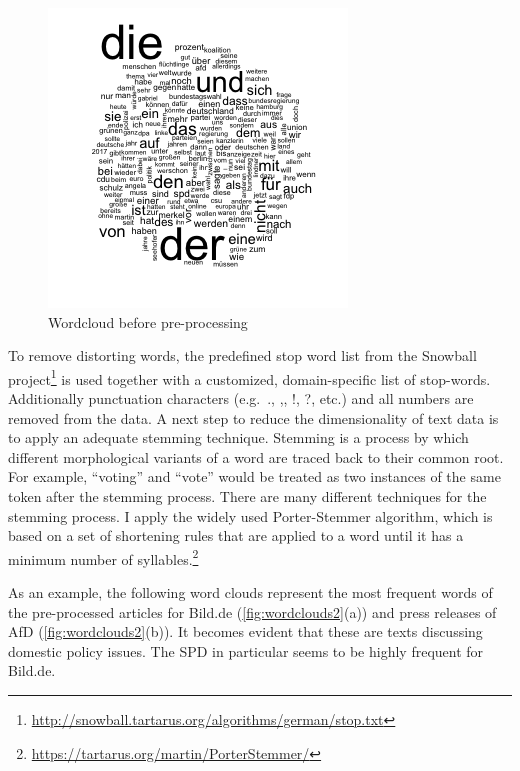 \documentclass[
]{article}
\begin{document}
\begin{figure}

{\centering \includegraphics[width=0.4\linewidth]{../figs/wordcloud} 

}

\caption{Wordcloud before pre-processing \label{fig:wordcloud1}}\label{fig:wordcloud pre-processing}
\end{figure}

To remove distorting words, the predefined stop word list from the
Snowball project\footnote{\url{http://snowball.tartarus.org/algorithms/german/stop.txt}}
is used together with a customized, domain-specific list of stop-words.
Additionally punctuation characters (e.g.~., ,, !, ?, etc.) and all
numbers are removed from the data. A next step to reduce the
dimensionality of text data is to apply an adequate stemming technique.
Stemming is a process by which different morphological variants of a
word are traced back to their common root. For example, ``voting'' and
``vote'' would be treated as two instances of the same token after the
stemming process. There are many different techniques for the stemming
process. I apply the widely used Porter-Stemmer algorithm, which is
based on a set of shortening rules that are applied to a word until it
has a minimum number of syllables.\footnote{\url{https://tartarus.org/martin/PorterStemmer/}}

As an example, the following word clouds represent the most frequent
words of the pre-processed articles for Bild.de
(\autoref{fig:wordclouds2}(a)) and press releases of AfD
(\autoref{fig:wordclouds2}(b)). It becomes evident that these are texts
discussing domestic policy issues. The SPD in particular seems to be
highly frequent for Bild.de.
\end{document}
